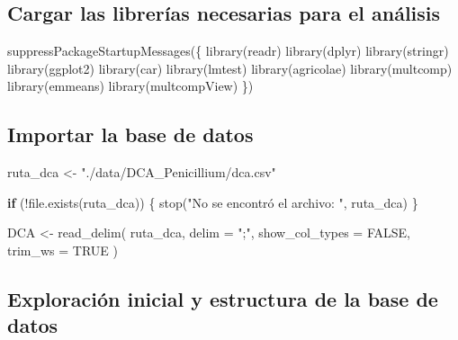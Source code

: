 \documentclass[
  spanish,
  letterpaper,
  DIV=11,
  numbers=noendperiod]{scrreprt}
\newenvironment{Shaded}{\begin{snugshade}}{\end{snugshade}}
\newcommand{\AttributeTok}[1]{\textcolor[rgb]{0.40,0.45,0.13}{#1}}
\newcommand{\ConstantTok}[1]{\textcolor[rgb]{0.56,0.35,0.01}{#1}}
\newcommand{\ControlFlowTok}[1]{\textcolor[rgb]{0.00,0.23,0.31}{\textbf{#1}}}
\newcommand{\FunctionTok}[1]{\textcolor[rgb]{0.28,0.35,0.67}{#1}}
\newcommand{\NormalTok}[1]{\textcolor[rgb]{0.00,0.23,0.31}{#1}}
\newcommand{\OtherTok}[1]{\textcolor[rgb]{0.00,0.23,0.31}{#1}}
\newcommand{\SpecialCharTok}[1]{\textcolor[rgb]{0.37,0.37,0.37}{#1}}
\newcommand{\StringTok}[1]{\textcolor[rgb]{0.13,0.47,0.30}{#1}}
\begin{document}
\subsection{Cargar las librerías necesarias para el
análisis}\label{cargar-las-libreruxedas-necesarias-para-el-anuxe1lisis}

\begin{Shaded}
\begin{Highlighting}[]
\FunctionTok{suppressPackageStartupMessages}\NormalTok{(\{}
\FunctionTok{library}\NormalTok{(readr)}
\FunctionTok{library}\NormalTok{(dplyr)}
\FunctionTok{library}\NormalTok{(stringr)}
\FunctionTok{library}\NormalTok{(ggplot2)}
\FunctionTok{library}\NormalTok{(car)}
\FunctionTok{library}\NormalTok{(lmtest)}
\FunctionTok{library}\NormalTok{(agricolae)}
\FunctionTok{library}\NormalTok{(multcomp)}
\FunctionTok{library}\NormalTok{(emmeans)}
\FunctionTok{library}\NormalTok{(multcompView)}
\NormalTok{\})}
\end{Highlighting}
\end{Shaded}

\subsection{Importar la base de datos}\label{importar-la-base-de-datos}

\begin{Shaded}
\begin{Highlighting}[]
\NormalTok{ruta\_dca }\OtherTok{\textless{}{-}} \StringTok{"./data/DCA\_Penicillium/dca.csv"}

\ControlFlowTok{if}\NormalTok{ (}\SpecialCharTok{!}\FunctionTok{file.exists}\NormalTok{(ruta\_dca)) \{}
  \FunctionTok{stop}\NormalTok{(}\StringTok{"No se encontró el archivo: "}\NormalTok{, ruta\_dca)}
\NormalTok{\}}

\NormalTok{DCA }\OtherTok{\textless{}{-}} \FunctionTok{read\_delim}\NormalTok{(}
\NormalTok{  ruta\_dca,}
  \AttributeTok{delim =} \StringTok{";"}\NormalTok{,}
  \AttributeTok{show\_col\_types =} \ConstantTok{FALSE}\NormalTok{,}
  \AttributeTok{trim\_ws =} \ConstantTok{TRUE}
\NormalTok{)}
\end{Highlighting}
\end{Shaded}

\subsection{Exploración inicial y estructura de la base de
datos}\label{exploraciuxf3n-inicial-y-estructura-de-la-base-de-datos}
\end{document}
